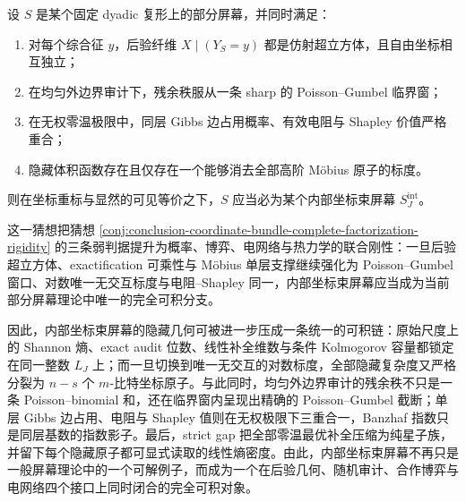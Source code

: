 \begin{conjecture}[完全可积屏幕的坐标束刻画]\label{conj:conclusion-coordinatebundle-complete-integrability-characterization}
设 \(S\) 是某个固定 dyadic 复形上的部分屏幕，并同时满足：
\begin{enumerate}
  \item 对每个综合征 \(y\)，后验纤维 \(X\mid (Y_S=y)\) 都是仿射超立方体，且自由坐标相互独立；
  \item 在均匀外边界审计下，残余秩服从一条 sharp 的 Poisson--Gumbel 临界窗；
  \item 在无权零温极限中，同层 Gibbs 边占用概率、有效电阻与 Shapley 价值严格重合；
  \item 隐藏体积函数存在且仅存在一个能够消去全部高阶 Möbius 原子的标度。
\end{enumerate}
则在坐标重标与显然的可见等价之下，\(S\) 应当必为某个内部坐标束屏幕 \(S_J^{\mathrm{int}}\)。

这一猜想把猜想 \ref{conj:conclusion-coordinate-bundle-complete-factorization-rigidity} 的三条弱判据提升为概率、博弈、电网络与热力学的联合刚性：一旦后验超立方体、exactification 可乘性与 Möbius 单层支撑继续强化为 Poisson--Gumbel 窗口、对数唯一无交互标度与电阻--Shapley 同一，内部坐标束屏幕应当成为当前部分屏幕理论中唯一的完全可积分支。
\end{conjecture}

\noindent
因此，内部坐标束屏幕的隐藏几何可被进一步压成一条统一的可积链：原始尺度上的 Shannon 熵、exact audit 位数、线性补全维数与条件 Kolmogorov 容量都锁定在同一整数 \(L_J\) 上；而一旦切换到唯一无交互的对数标度，全部隐藏复杂度又严格分裂为 \(n-s\) 个 \(m\)-比特坐标原子。与此同时，均匀外边界审计的残余秩不只是一条 Poisson--binomial 和，还在临界窗内呈现出精确的 Poisson--Gumbel 截断；单层 Gibbs 边占用、电阻与 Shapley 值则在无权极限下三重合一，Banzhaf 指数只是同层基数的指数影子。最后，strict gap 把全部零温最优补全压缩为纯星子族，并留下每个隐藏原子都可显式读取的线性熵密度。由此，内部坐标束屏幕不再只是一般屏幕理论中的一个可解例子，而成为一个在后验几何、随机审计、合作博弈与电网络四个接口上同时闭合的完全可积对象。

\endinput
